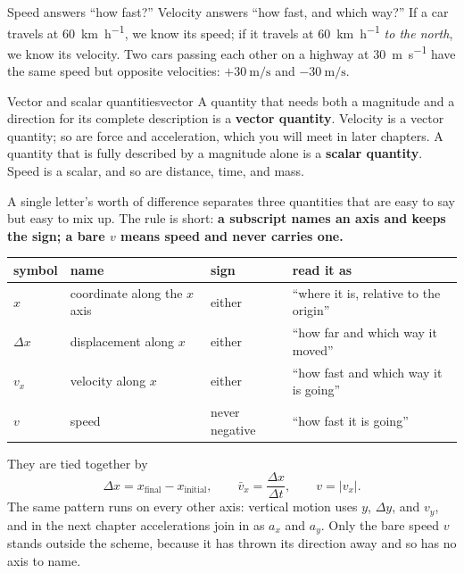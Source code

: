 \documentclass[11pt,twoside,openany]{book}
\begin{document}
Speed answers ``how fast?'' Velocity answers ``how fast, and which way?'' If a car travels at \SI{60}{\kilo\metre\per\hour}, we know its speed; if it travels at \SI{60}{\kilo\metre\per\hour} \emph{to the north}, we know its velocity. Two cars passing each other on a highway at \SI{30}{\metre\per\second} have the same speed but opposite velocities: $+\SI{30}{\metre\per\second}$ and $-\SI{30}{\metre\per\second}$.

\begin{definition}{Vector and scalar quantities}{vector}
A quantity that needs both a magnitude and a direction for its complete description is a \textbf{vector quantity}. Velocity is a vector quantity; so are force and acceleration, which you will meet in later chapters. A quantity that is fully described by a magnitude alone is a \textbf{scalar quantity}. Speed is a scalar, and so are distance, time, and mass.
\end{definition}

\begin{keyidea}
A single letter's worth of difference separates three quantities that are easy to say but easy to mix up. The rule is short: \textbf{a subscript names an axis and keeps the sign; a bare $v$ means speed and never carries one.}
\begin{center}
\renewcommand{\arraystretch}{1.3}
\small
\begin{tabular}{llll}
\toprule
symbol & name & sign & read it as \\
\midrule
$x$ & coordinate along the $x$ axis & either & ``where it is, relative to the origin'' \\
$\Delta x$ & displacement along $x$ & either & ``how far and which way it moved'' \\
$v_x$ & velocity along $x$ & either & ``how fast and which way it is going'' \\
$v$ & speed & never negative & ``how fast it is going'' \\
\bottomrule
\end{tabular}
\end{center}
They are tied together by
\[
\Delta x = x_{\text{final}} - x_{\text{initial}}, \qquad
\bar v_x = \frac{\Delta x}{\Delta t}, \qquad
v = |v_x| .
\]
The same pattern runs on every other axis: vertical motion uses $y$, $\Delta y$, and $v_y$, and in the next chapter accelerations join in as $a_x$ and $a_y$. Only the bare speed $v$ stands outside the scheme, because it has thrown its direction away and so has no axis to name.
\end{keyidea}
\end{document}
